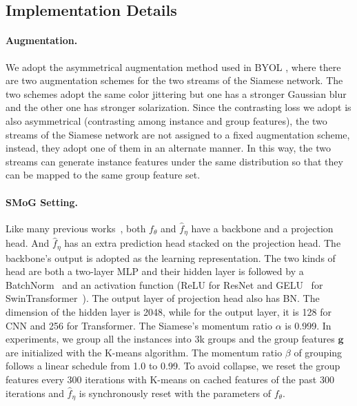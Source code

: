 \documentclass[runningheads]{style/llncs}
\begin{document}
\subsection{Implementation Details}

\paragraph{Augmentation.}
We adopt the asymmetrical augmentation method used in BYOL \cite{byol}, where there are two augmentation schemes for the two streams of the Siamese network. The two schemes adopt the same color jittering but one has a stronger Gaussian blur and the other one has stronger solarization. Since the contrasting loss we adopt is also asymmetrical (contrasting among instance and group features), the two streams of the Siamese network are not assigned to a fixed augmentation scheme, instead, they adopt one of them in an alternate manner. In this way, the two streams can generate instance features under the same distribution so that they can be mapped to the same group feature set. 

\paragraph{SMoG Setting.}  
Like many previous works~\cite{byol,mocov3,moby}, both $f_\theta$ and $\hat f_\eta$ have a backbone and a projection head. And $\hat f_\eta$ has an extra prediction head stacked on the projection head. The backbone's output is adopted as the learning representation. The two kinds of head are both a two-layer MLP and their hidden layer is followed by a BatchNorm~\cite{bn} and an activation function (ReLU for ResNet and GELU~\cite{gelu} for SwinTransformer~\cite{SwinT}). The output layer of projection head also has BN. The dimension of the hidden layer is 2048, while for the output layer, it is 128 for CNN and 256 for Transformer. The Siamese's momentum ratio $\alpha$ is 0.999. In experiments, we group all the instances into 3k groups and the group features $\mathbf{g}$ are initialized with the K-means algorithm. The momentum ratio $\beta$ of grouping follows a linear schedule from 1.0 to 0.99. To avoid collapse, we reset the group features every 300 iterations with K-means on cached features of the past 300 iterations and $\hat f_\eta$ is synchronously reset with the parameters of $f_\theta$.
\end{document}
